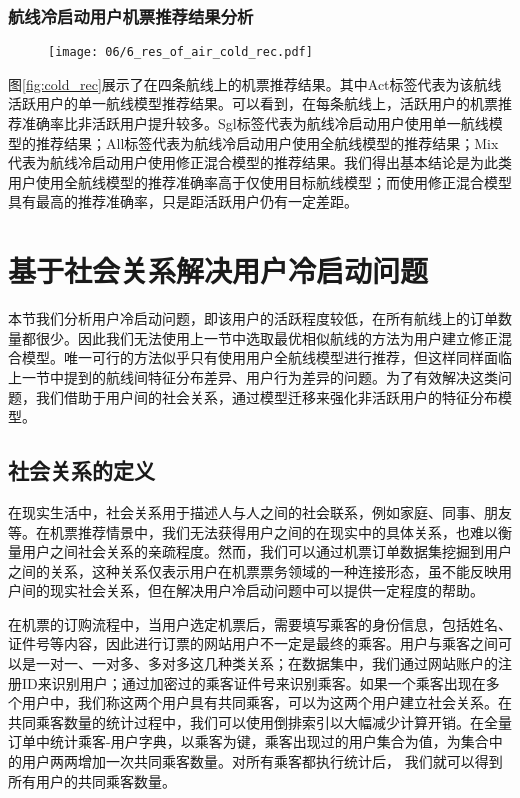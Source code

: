 \subsubsection{航线冷启动用户机票推荐结果分析}

\begin{figure}
 \centering
 \texttt{[image: 06/6\_res\_of\_air\_cold\_rec.pdf]}
\end{figure}

图\ref{fig:cold_rec}展示了在四条航线上的机票推荐结果。其中Act标签代表为该航线活跃用户的单一航线模型推荐结果。可以看到，在每条航线上，活跃用户的机票推荐准确率比非活跃用户提升较多。Sgl标签代表为航线冷启动用户使用单一航线模型的推荐结果；All标签代表为航线冷启动用户使用全航线模型的推荐结果；Mix代表为航线冷启动用户使用修正混合模型的推荐结果。我们得出基本结论是为此类用户使用全航线模型的推荐准确率高于仅使用目标航线模型；而使用修正混合模型具有最高的推荐准确率，只是距活跃用户仍有一定差距。


\section{基于社会关系解决用户冷启动问题}

本节我们分析用户冷启动问题，即该用户的活跃程度较低，在所有航线上的订单数量都很少。因此我们无法使用上一节中选取最优相似航线的方法为用户建立修正混合模型。唯一可行的方法似乎只有使用用户全航线模型进行推荐，但这样同样面临上一节中提到的航线间特征分布差异、用户行为差异的问题。为了有效解决这类问题，我们借助于用户间的社会关系，通过模型迁移来强化非活跃用户的特征分布模型。


\subsection{社会关系的定义}
在现实生活中，社会关系用于描述人与人之间的社会联系，例如家庭、同事、朋友等。在机票推荐情景中，我们无法获得用户之间的在现实中的具体关系，也难以衡量用户之间社会关系的亲疏程度。然而，我们可以通过机票订单数据集挖掘到用户之间的关系，这种关系仅表示用户在机票票务领域的一种连接形态，虽不能反映用户间的现实社会关系，但在解决用户冷启动问题中可以提供一定程度的帮助。

在机票的订购流程中，当用户选定机票后，需要填写乘客的身份信息，包括姓名、证件号等内容，因此进行订票的网站用户不一定是最终的乘客。用户与乘客之间可以是一对一、一对多、多对多这几种类关系；在数据集中，我们通过网站账户的注册ID来识别用户；通过加密过的乘客证件号来识别乘客。如果一个乘客出现在多个用户中，我们称这两个用户具有共同乘客，可以为这两个用户建立社会关系。在共同乘客数量的统计过程中，我们可以使用倒排索引以大幅减少计算开销。在全量订单中统计乘客-用户字典，以乘客为键，乘客出现过的用户集合为值，为集合中的用户两两增加一次共同乘客数量。对所有乘客都执行统计后，
我们就可以得到所有用户的共同乘客数量。

